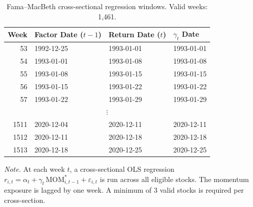 \begin{table}[htbp]
\centering
\caption{Fama--MacBeth cross-sectional regression windows. Valid weeks: 1,461.}
\label{tab:fm_calc}
\small
\begin{tabular}{r l l l}
\toprule
    Week & Factor Date ($t{-}1$) & Return Date ($t$) & $\gamma_t$ Date \\
\midrule
    53 & 1992-12-25 & 1993-01-01 & 1993-01-01 \\
    54 & 1993-01-01 & 1993-01-08 & 1993-01-08 \\
    55 & 1993-01-08 & 1993-01-15 & 1993-01-15 \\
    56 & 1993-01-15 & 1993-01-22 & 1993-01-22 \\
    57 & 1993-01-22 & 1993-01-29 & 1993-01-29 \\
    \multicolumn{4}{c}{$\vdots$} \\
    1511 & 2020-12-04 & 2020-12-11 & 2020-12-11 \\
    1512 & 2020-12-11 & 2020-12-18 & 2020-12-18 \\
    1513 & 2020-12-18 & 2020-12-25 & 2020-12-25 \\
\bottomrule
\end{tabular}
\vspace{4pt}
\begin{flushleft}
\footnotesize
\textit{Note.} At each week $t$, a cross-sectional OLS regression $r_{i,t} = \alpha_t + \gamma_t \, \text{MOM}^{*}_{i,t-1} + \varepsilon_{i,t}$ is run across all eligible stocks. The momentum exposure is lagged by one week. A minimum of 3 valid stocks is required per cross-section.
\end{flushleft}
\end{table}
